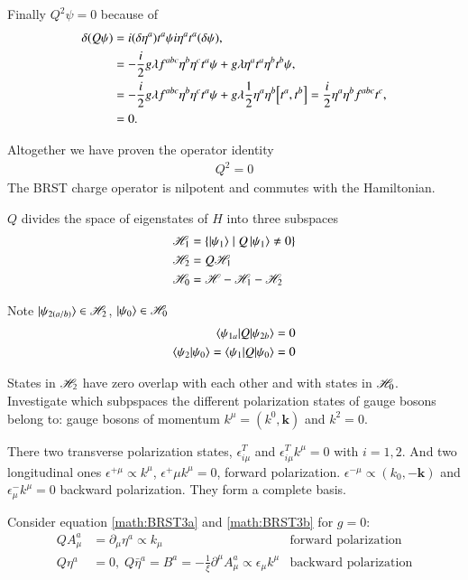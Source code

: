 Finally $Q^2 \psi = 0$ because of 
\begin{align*}
   \delta (Q \psi) &= i (\delta \eta^a) t^a \psi i \eta^a t^a (\delta \psi), \\
                 &= - \frac{i}{2} g \lambda f^{abc} \eta^b \eta^c t^a \psi + g \lambda \eta^a t^a \eta^b t^b \psi, \\
                 &= - \frac{i}{2} g \lambda f^{abc} \eta^b \eta^c t^a \psi + g \lambda\frac{1}{2} \eta^a \eta^b \comm{t^a}{t^b} = \frac{i}{2} \eta^a \eta^b f^{abc} t^c, \\
                 &= 0.
\end{align*}

Altogether we have proven the operator identity
\begin{align}
   Q^2 = 0
\end{align}
The BRST charge operator is nilpotent and commutes with the Hamiltonian.

$Q$ divides the space of eigenstates of $H$ into three subspaces
\begin{align*}
   \mathscr{H}_1 &= \left\{ \ket{\psi_1} \mid Q \ket{\psi_1} \neq 0 \right\} \\
   \mathscr{H}_2 &= Q \mathscr{H}_1 \\
   \mathscr{H}_0 &= \mathscr{H} - \mathscr{H}_1 - \mathscr{H}_2
\end{align*} 

Note $\ket{\psi_{2(a/b)}} \in \mathscr{H}_2$, $\ket{\psi_0} \in \mathscr{H}_0$
\begin{align*}
   \braket{\psi_{1a} | Q | \psi_{2b}} = 0 \\
   \braket{\psi_2 | \psi_0} = \braket{\psi_1 | Q | \psi_0} = 0
\end{align*}

States in $\mathscr{H}_2$ have zero overlap with each other and with  states in $\mathscr{H}_0$. Investigate which subpspaces the different polarization states of gauge bosons belong to: gauge bosons of momentum $k^\mu = (k^0, \pmb{k})$ and $k^2 = 0$.

There two transverse polarization states, $\epsilon^T_{i \mu}$ and $\epsilon_{i\mu}^T k^\mu = 0$ with $i=1,2$. And two longitudinal ones $\epsilon^{+\mu} \propto k^\mu$, $\epsilon^+\mu k^\mu = 0$, forward polarization. $\epsilon^{-\mu} \propto (k_0, -\pmb{k})$ and $\epsilon^-_\mu k^\mu = 0$ backward polarization. They form a complete basis.

Consider equation \ref{math:BRST3a} and \ref{math:BRST3b} for $g=0$:
\begin{align*}
   Q A_\mu^a &= \partial_\mu \eta^a \propto k_\mu &\text{forward polarization} \\
   Q \eta^a &= 0, \; Q\bar{\eta}^a = B^a = - \frac{1}{\xi} \partial^\mu A_\mu^a \propto \epsilon_\mu k^\mu &\text{backward polarization}
\end{align*}

